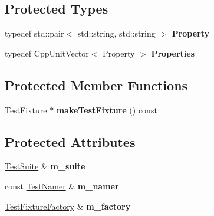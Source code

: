 \subsection*{Protected Types}
\begin{DoxyCompactItemize}
\item 
typedef std\+::pair$<$ std\+::string, std\+::string $>$ {\bfseries Property}\hypertarget{class_test_suite_builder_context_base_a1e2319a53ecd7a718c87f4ea5c42d4c6}{}\label{class_test_suite_builder_context_base_a1e2319a53ecd7a718c87f4ea5c42d4c6}

\item 
typedef Cpp\+Unit\+Vector$<$ Property $>$ {\bfseries Properties}\hypertarget{class_test_suite_builder_context_base_a95565394a60a8b8d843a5a64d2572a86}{}\label{class_test_suite_builder_context_base_a95565394a60a8b8d843a5a64d2572a86}

\end{DoxyCompactItemize}
\subsection*{Protected Member Functions}
\begin{DoxyCompactItemize}
\item 
\hyperlink{class_test_fixture}{Test\+Fixture} $\ast$ {\bfseries make\+Test\+Fixture} () const \hypertarget{class_test_suite_builder_context_base_a5474060095c1ab76f16a133af0fb3b52}{}\label{class_test_suite_builder_context_base_a5474060095c1ab76f16a133af0fb3b52}

\end{DoxyCompactItemize}
\subsection*{Protected Attributes}
\begin{DoxyCompactItemize}
\item 
\hyperlink{class_test_suite}{Test\+Suite} \& {\bfseries m\+\_\+suite}\hypertarget{class_test_suite_builder_context_base_a16ea2e4d82cd9f94b843839dc8ed2931}{}\label{class_test_suite_builder_context_base_a16ea2e4d82cd9f94b843839dc8ed2931}

\item 
const \hyperlink{class_test_namer}{Test\+Namer} \& {\bfseries m\+\_\+namer}\hypertarget{class_test_suite_builder_context_base_abdbbb982c6c41ae8ecc5abe954c56e70}{}\label{class_test_suite_builder_context_base_abdbbb982c6c41ae8ecc5abe954c56e70}

\item 
\hyperlink{class_test_fixture_factory}{Test\+Fixture\+Factory} \& {\bfseries m\+\_\+factory}\hypertarget{class_test_suite_builder_context_base_ad814ae6df45822300bf99dfcee0277f7}{}\label{class_test_suite_builder_context_base_ad814ae6df45822300bf99dfcee0277f7}

\end{DoxyCompactItemize}
